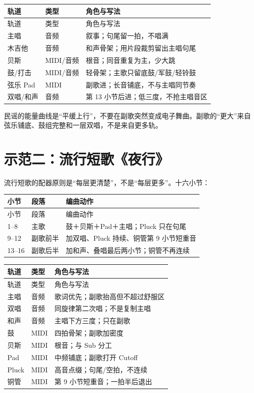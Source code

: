\begin{longtable}{p{}p{}p{}}
\toprule
轨道 & 类型 & 角色与写法 \\
\midrule
\endfirsthead
\toprule
轨道 & 类型 & 角色与写法 \\
\midrule
\endhead
主唱 & 音频 & 叙事；句尾留一拍，不唱满 \\
木吉他 & 音频 & 和声骨架；用片段裁剪留出主唱句尾 \\
贝斯 & MIDI/音频 & 根音；同音重复为主，少大跳 \\
鼓/打击 & MIDI/音频 & 轻骨架；主歌只留底鼓/军鼓/轻铃鼓 \\
弦乐 Pad & MIDI & 副歌进；长音铺底，不与主唱同节奏 \\
双唱/和声 & 音频 & 第 13 小节后进；低三度，不抢主唱音区 \\
\bottomrule
\end{longtable}

民谣的能量曲线是“平缓上行”，不要在副歌突然变成电子舞曲。副歌的“更大”来自弦乐铺底、鼓组完整和一层双唱，不是来自更多轨。

\section{示范二：流行短歌《夜行》}
\label{sec:pop-demo}

流行短歌的配器原则是“每层更清楚”，不是“每层更多”。十六小节：

\begin{longtable}{p{}p{}p{}}
\toprule
小节 & 段落 & 编曲动作 \\
\midrule
\endfirsthead
\toprule
小节 & 段落 & 编曲动作 \\
\midrule
\endhead
1--8 & 主歌 & 鼓＋贝斯＋Pad＋主唱；Pluck 只在句尾 \\
9--12 & 副歌前半 & 加双唱、Pluck 持续、铜管第 9 小节短重音 \\
13--16 & 副歌后半 & 加和声、叠唱最后两小节；铜管不再连续 \\
\bottomrule
\end{longtable}

\begin{longtable}{p{}p{}p{}}
\toprule
轨道 & 类型 & 角色与写法 \\
\midrule
\endfirsthead
\toprule
轨道 & 类型 & 角色与写法 \\
\midrule
\endhead
主唱 & 音频 & 歌词优先；副歌抬高但不超过舒服区 \\
双唱 & 音频 & 同旋律第二次唱；不是复制主唱 \\
和声 & 音频 & 主唱下方三度；只在副歌 \\
鼓 & MIDI & 四拍骨架；副歌加密度 \\
贝斯 & MIDI & 根音；与 Sub 分工 \\
Pad & MIDI & 中频铺底；副歌打开 Cutoff \\
Pluck & MIDI & 高音点缀；句尾/空拍，不连续 \\
铜管 & MIDI & 第 9 小节短重音；一拍半后退出 \\
\bottomrule
\end{longtable}

